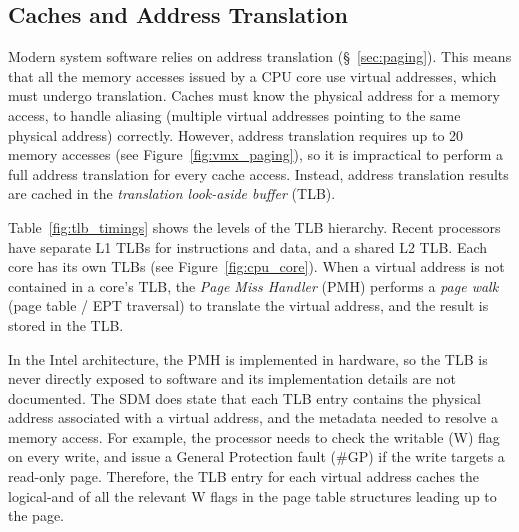 \subsection{Caches and Address Translation}
\label{sec:tlbs}

Modern system software relies on address translation (\S~\ref{sec:paging}).
This means that all the memory accesses issued by a CPU core use virtual
addresses, which must undergo translation. Caches must know the physical
address for a memory access, to handle aliasing (multiple virtual addresses
pointing to the same physical address) correctly. However, address translation
requires up to 20 memory accesses (see Figure~\ref{fig:vmx_paging}), so it is
impractical to perform a full address translation for every cache access.
Instead, address translation results are cached in the \textit{translation
look-aside buffer} (TLB).

Table~\ref{fig:tlb_timings} shows the levels of the TLB hierarchy. Recent
processors have separate L1 TLBs for instructions and data, and a shared L2
TLB. Each core has its own TLBs (see Figure~\ref{fig:cpu_core}). When a virtual
address is not contained in a core's TLB, the \textit{Page Miss Handler} (PMH)
performs a \textit{page walk} (page table / EPT traversal) to translate the
virtual address, and the result is stored in the TLB.

\begin{table}[hbt]
  \caption{
    Approximate sizes and access times for each level in the TLB hierarchy,
    from \cite{7zip2014haswell}.
  }
  \label{fig:tlb_timings}
\end{table}


In the Intel architecture, the PMH is implemented in hardware, so the TLB is
never directly exposed to software and its implementation details are not
documented.  The SDM does state that each TLB entry contains the physical
address associated with a virtual address, and the metadata needed to resolve a
memory access. For example, the processor needs to check the writable (W) flag
on every write, and issue a General Protection fault (\#GP) if the write
targets a read-only page.  Therefore, the TLB entry for each virtual address
caches the logical-and of all the relevant W flags in the page table structures
leading up to the page.

